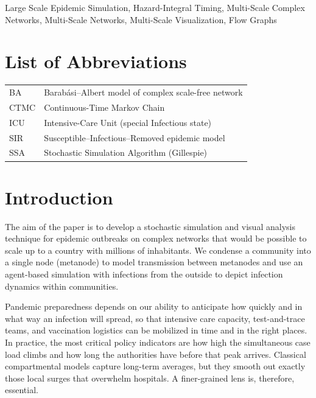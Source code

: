 \documentclass[
]{ceurart}
\begin{document}
\begin{keywords}
Large Scale Epidemic Simulation, Hazard-Integral Timing, Multi-Scale Complex Networks, Multi-Scale Networks, Multi-Scale Visualization, Flow Graphs
\end{keywords}

\maketitle

\section*{List of Abbreviations}

\begin{tabular}{@{}ll@{}}
BA  & Barabási–Albert model of complex scale-free network\\
CTMC  & Continuous-Time Markov Chain \\
ICU   & Intensive-Care Unit (special Infectious state) \\
SIR   & Susceptible–Infectious–Removed epidemic model \\
SSA   & Stochastic Simulation Algorithm (Gillespie) \\
\end{tabular}



\section{Introduction}
The aim of the paper is to develop a stochastic simulation and visual analysis technique for epidemic outbreaks on complex networks that would be possible to scale up to a country with millions of inhabitants. We condense a community into a single node (metanode) to model transmission between metanodes and use an agent-based simulation with infections from the outside to depict infection dynamics within communities.

Pandemic preparedness depends on our ability to anticipate how quickly and in what way an infection will spread, so that intensive care capacity, test-and-trace teams, and vaccination logistics can be mobilized in time and in the right places. In practice, the most critical policy indicators are how high the simultaneous case load climbs and how long the authorities have before that peak arrives. Classical compartmental models capture long-term averages, but they smooth out exactly those local surges that overwhelm hospitals. A finer-grained lens is, therefore, essential.
\end{document}
